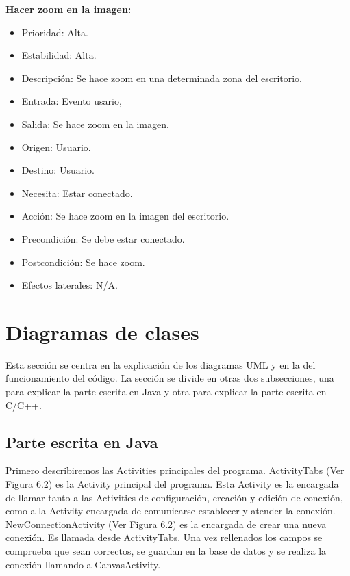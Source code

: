 \textbf{Hacer zoom en la imagen:}
\begin{itemize}
\item Prioridad: Alta.
\item Estabilidad: Alta.
\item Descripción: Se hace zoom en una determinada zona del escritorio.
\item Entrada: Evento usario,
\item Salida: Se hace zoom en la imagen.
\item Origen: Usuario.
\item Destino: Usuario.
\item Necesita: Estar conectado.
\item Acción: Se hace zoom en la imagen del escritorio.
\item Precondición: Se debe estar conectado.
\item Postcondición: Se hace zoom.
\item Efectos laterales: N/A.\\

\end{itemize}
\newpage
\section {Diagramas de clases}

Esta sección se centra en la explicación de los diagramas UML y en la del funcionamiento del código. La sección se divide en otras dos subsecciones, una para explicar la parte escrita en Java y otra para explicar la parte escrita en C/C++.

\subsection{Parte escrita en Java}

Primero describiremos las Activities principales del programa. ActivityTabs (Ver Figura 6.2) es la Activity principal del programa. Esta Activity es la encargada de llamar tanto a las Activities de configuración, creación y edición de conexión, como a la Activity encargada de comunicarse establecer y atender la conexión.\\

NewConnectionActivity (Ver Figura 6.2) es la encargada de crear una nueva conexión. Es llamada desde ActivityTabs. Una vez rellenados los campos se comprueba que sean correctos, se guardan en la base de datos y se realiza la conexión llamando a CanvasActivity.\\

